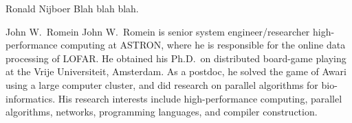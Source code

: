 \documentclass[journal]{IEEEtran}
\begin{document}
\begin{IEEEbiography}{Ronald Nijboer}
Blah blah blah.
\end{IEEEbiography}




\begin{IEEEbiography}{John W.\ Romein}
John W.\ Romein is senior system engineer/researcher high-performance
computing at ASTRON, where he is responsible for the online data processing
of LOFAR.
He obtained his Ph.D.\ on distributed board-game playing at the Vrije
Universiteit, Amsterdam.
As a postdoc, he solved the game of Awari using a large computer cluster,
and did research on parallel algorithms for bio-informatics.
His research interests include high-performance computing, parallel algorithms,
networks, programming languages, and compiler construction.
\end{IEEEbiography}






\end{document}
